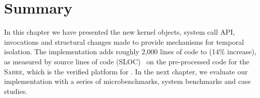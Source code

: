 \section{Summary}

In this chapter we have presented the new kernel objects, system call API, invocations and 
structural changes made to provide mechanisms for temporal isolation. 
The implementation adds roughly 2,000 lines of code to \selfour (14\% increase), as measured
by source lines of code (SLOC)~\citep{Wheeler_01} on the pre-processed code for the \textsc{Sabre},
which is the verified platform for \selfour.
In the next chapter, we evaluate our implementation with a series of microbenchmarks, 
system benchmarks and case studies.


